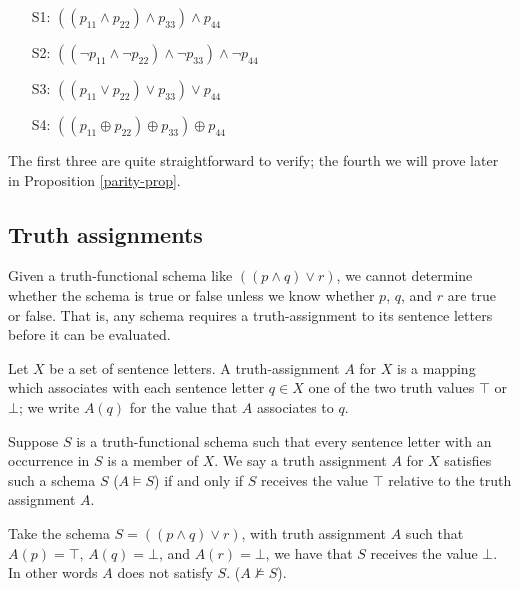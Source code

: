 \begin{enumerate}
\item[S1:] $((p_{11}\wedge p_{22})\wedge p_{33})\wedge p_{44}$\label{sallnar}
\item[S2:] $((\neg p_{11}\wedge\neg p_{22})\wedge\neg p_{33})\wedge\neg p_{44}$\label{snonar}
\item[S3:] $((p_{11}\vee p_{22})\vee p_{33})\vee p_{44}$\label{sonenar}
\item[S4:] $((p_{11}\oplus p_{22})\oplus p_{33})\oplus p_{44}$\label{sevennar}
\end{enumerate}

The first three are quite straightforward to verify; the fourth we will prove later in Proposition \ref{parity-prop}. 


\subsection{Truth assignments}

Given a truth-functional schema like $((p \wedge q) \vee r)$, we cannot determine whether the schema is true or false unless we know whether $p$, $q$, and $r$ are true or false. That is, any schema requires a truth-assignment to its sentence letters before it can be evaluated. 

\begin{definition}
Let $X$ be a set of sentence letters. A truth-assignment $A$ for $X$ is a mapping which associates with each sentence letter $q\in X$ one of the two truth values $\top$ or $\bot$; we write $A(q)$ for the value that $A$ associates to $q$. 

Suppose $S$ is a truth-functional schema such that every sentence letter with an occurrence in $S$ is a member of $X$. We say a truth assignment $A$ for $X$ satisfies such a schema $S$ ($A\models S$) if and only if $S$ receives the value $\top$ relative to the truth assignment $A$. 
\end{definition}

\begin{example}
Take the schema $S = ((p \wedge q) \vee r)$, with truth assignment $A$ such that $A(p) = \top$, $A(q) = \bot$, and $A(r) = \bot$, we have that $S$ receives the value $\bot$. In other words $A$ does not satisfy $S$. ($A \not \models S$).
\end{example}


